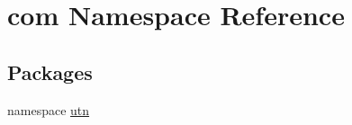 \hypertarget{namespacecom}{\section{com \-Namespace \-Reference}
\label{namespacecom}
}
\subsection*{\-Packages}
\begin{DoxyCompactItemize}
\item 
namespace \hyperlink{namespacecom_1_1utn}{utn}
\end{DoxyCompactItemize}
